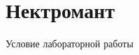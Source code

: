 \chapter{Нектромант}
\hypertarget{index}{}\label{index}
\label{index_md_mainpage}%
%
Условие лабораторной работы

 